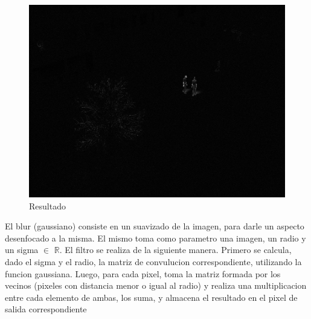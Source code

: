 \begin{figure}[H]
\begin{center}

  \includegraphics[width=\linewidth]{img/scene0.png}
  \caption{{\small Resultado}} 
\endminipage

\end{center}
\end{figure}

El blur (gaussiano) consiste en un suavizado de la imagen, para darle un aspecto desenfocado a la misma. El mismo toma como parametro una imagen, un radio y un sigma $\in$ $\mathbb{R}$. El filtro se realiza de la siguiente manera. Primero se calcula, dado el sigma y el radio, la matriz de convulucion correspondiente, utilizando la funcion gaussiana. Luego, para cada pixel, toma la matriz formada por los vecinos (pixeles con distancia menor o igual al radio) y realiza una multiplicacion entre cada elemento de ambas, los suma, y almacena el resultado en el pixel de salida correspondiente \\

